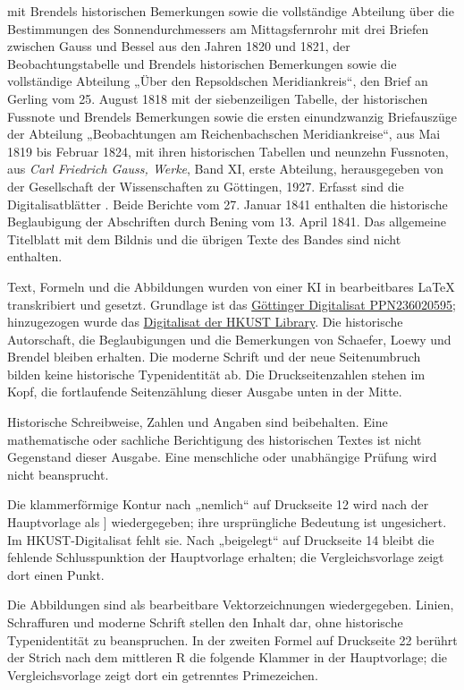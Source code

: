 mit Brendels historischen Bemerkungen sowie die vollständige Abteilung über die Bestimmungen des Sonnendurchmessers am Mittagsfernrohr mit drei Briefen zwischen Gauss und Bessel aus den Jahren 1820 und 1821, der Beobachtungstabelle und Brendels historischen Bemerkungen sowie die vollständige Abteilung „Über den Repsoldschen Meridiankreis“, den Brief an Gerling vom 25. August 1818 mit der siebenzeiligen Tabelle, der historischen Fussnote und Brendels Bemerkungen sowie die ersten einundzwanzig Briefauszüge der Abteilung „Beobachtungen am Reichenbachschen Meridiankreise“, aus Mai 1819 bis Februar 1824, mit ihren historischen Tabellen und neunzehn Fussnoten, aus \textit{Carl Friedrich Gauss, Werke}, Band XI, erste Abteilung, herausgegeben von der Gesellschaft der Wissenschaften zu Göttingen, 1927. Erfasst sind die Digitalisatblätter \SourceScope. Beide Berichte vom 27. Januar 1841 enthalten die historische Beglaubigung der Abschriften durch Bening vom 13. April 1841. Das allgemeine Titelblatt mit dem Bildnis und die übrigen Texte des Bandes sind nicht enthalten.

Text, Formeln und die Abbildungen wurden von einer KI in bearbeitbares LaTeX transkribiert und gesetzt. Grundlage ist das \href{https://gdz.sub.uni-goettingen.de/id/PPN236020595}{Göttinger Digitalisat PPN236020595}; hinzugezogen wurde das \href{https://lbezone.hkust.edu.hk/obj/4/o/b761099/v11,1/pg00011.jpg}{Digitalisat der HKUST Library}. Die historische Autorschaft, die Beglaubigungen und die Bemerkungen von Schaefer, Loewy und Brendel bleiben erhalten. Die moderne Schrift und der neue Seitenumbruch bilden keine historische Typenidentität ab. Die Druckseitenzahlen stehen im Kopf, die fortlaufende Seitenzählung dieser Ausgabe unten in der Mitte.

Historische Schreibweise, Zahlen und Angaben sind beibehalten. Eine mathematische oder sachliche Berichtigung des historischen Textes ist nicht Gegenstand dieser Ausgabe. Eine menschliche oder unabhängige Prüfung wird nicht beansprucht.

Die klammerförmige Kontur nach „nemlich“ auf Druckseite 12 wird nach der Hauptvorlage als ] wiedergegeben; ihre ursprüngliche Bedeutung ist ungesichert. Im HKUST-Digitalisat fehlt sie. Nach „beigelegt“ auf Druckseite 14 bleibt die fehlende Schlusspunktion der Hauptvorlage erhalten; die Vergleichsvorlage zeigt dort einen Punkt.

Die Abbildungen sind als bearbeitbare Vektorzeichnungen wiedergegeben. Linien, Schraffuren und moderne Schrift stellen den Inhalt dar, ohne historische Typenidentität zu beanspruchen. In der zweiten Formel auf Druckseite 22 berührt der Strich nach dem mittleren R die folgende Klammer in der Hauptvorlage; die Vergleichsvorlage zeigt dort ein getrenntes Primezeichen.

